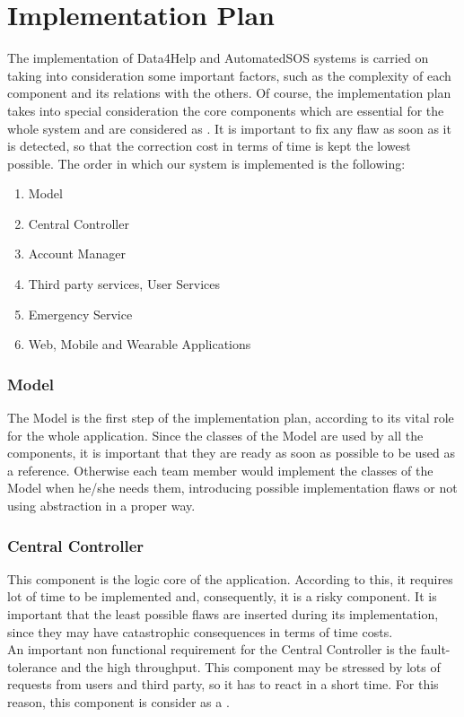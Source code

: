 \section{Implementation Plan}
The implementation of Data4Help and AutomatedSOS systems is carried on taking into consideration some important factors, such as the complexity of each component and its relations with the others. Of course, the implementation plan takes into special consideration the core components which are essential for the whole system and are considered as . 
It is important to fix any flaw as soon as it is detected, so that the correction cost in terms of time is kept the lowest possible.
The order in which our system is implemented is the following:

\begin{enumerate}
    \item Model
    \item Central Controller
    \item Account Manager
    \item Third party services, User Services
    \item Emergency Service
    \item Web, Mobile and Wearable Applications
\end{enumerate}
\begin{figure}[H]
\end{figure}

\subsubsection{Model}
The Model is the first step of the implementation plan, according to its vital role for the whole application.
Since the classes of the Model are used by all the components, it is important that they are ready as soon as possible to be used as a reference. Otherwise each team member would implement the classes of the Model  when he/she needs them, introducing possible implementation flaws or not using abstraction in a proper way.

\subsubsection{Central Controller}
This component is the logic core of the application. According to this, it requires lot of time to be implemented and, consequently, it is a risky component. It is important that the least possible flaws are inserted during its implementation, since they may have catastrophic consequences in terms of time costs.\\
An important non functional requirement for the Central Controller is the fault-tolerance and the high throughput. This component may be stressed by lots of requests from users and third party, so it has to react in a short time. For this reason, this component is consider as a .

